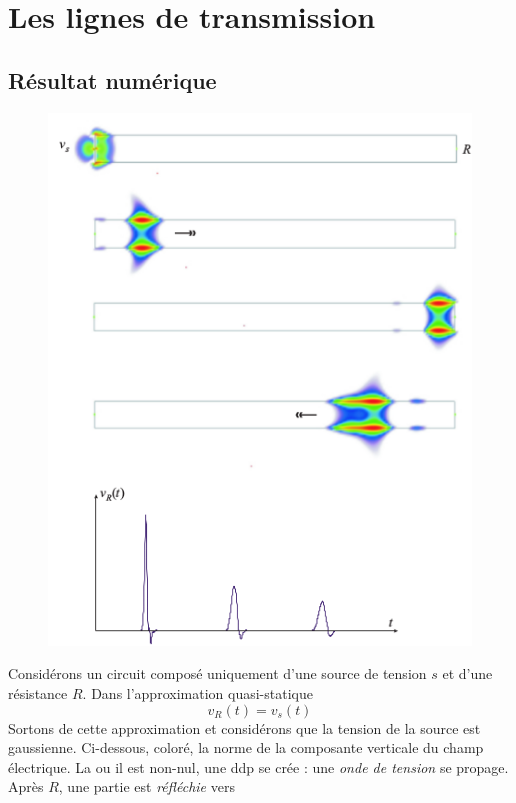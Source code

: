 \chapter{Les lignes de transmission}

\section{Résultat numérique}
\begin{figure}
	\vspace{-5mm}
	\includegraphics[scale=0.25]{ch2/image1.png}
\end{figure}
Considérons un circuit composé uniquement d'une source de tension $s$ et d'une résistance $R$. Dans 
l'approximation quasi-statique
\begin{equation}
v_R(t) = v_s(t)
\end{equation}
Sortons de cette approximation et considérons que la tension de la source est gaussienne. Ci-dessous, 
coloré, la norme de la composante verticale du champ électrique. La ou il est non-nul, une ddp 
se crée : une \textit{onde de tension} se propage. Après $R$, une partie est \textit{réfléchie} vers 
